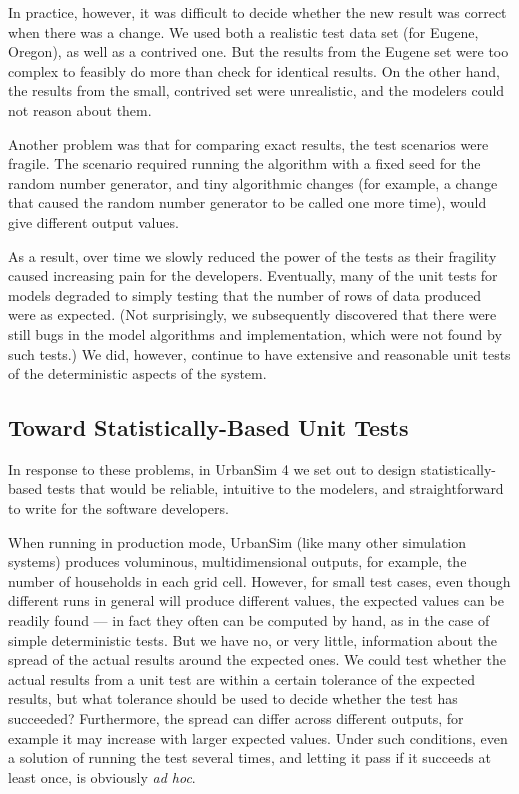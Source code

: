 \documentclass{sig-alternate-preprint}
\begin{document}
In practice, however, it was difficult to decide whether the new result was
correct when there was a change.  We used both a realistic test data set
(for Eugene, Oregon), as well as a contrived one.  But the results from the
Eugene set were too complex to feasibly do more than check for identical
results.  On the other hand, the results from the small, contrived set were
unrealistic, and the modelers could not reason about them.

Another problem was that for comparing exact results, the test scenarios were
fragile.  The scenario required running the algorithm with a fixed seed for the
random number generator, and tiny algorithmic changes (for example, a change
that caused the random number generator to be called one more time), would give
different output values.

As a result, over time we slowly reduced the power of the
tests as their fragility caused increasing pain for the developers.
Eventually, many of the unit tests for models
degraded to simply testing that the
number of rows of data produced were as expected.  (Not surprisingly, we
subsequently discovered that there were still bugs in the model algorithms
and implementation, which were not found by such tests.)  We did, however, continue to
have extensive and reasonable unit tests of the deterministic aspects of
the system.

\subsection{Toward Statistically-Based Unit Tests}

In response to these problems, in UrbanSim 4 we set out to
design statistically-based tests that would be reliable, intuitive to the
modelers, and straightforward to write for the software developers.

When running in production mode, UrbanSim (like many other simulation
systems) produces voluminous, multidimensional outputs, for example, the
number of households in each grid cell.  However, for small test cases,
even though different runs in general will produce different values, the
expected values can be readily found --- in fact they often can be computed
by hand, as in the case of simple deterministic tests.
But we have no, or very little, information about the spread of the
actual results around the expected ones.  We could test whether the actual
results from a unit test are within a certain tolerance of the expected
results, but what tolerance should be used to decide whether the test has
succeeded?  Furthermore, the spread can differ across different outputs,
for example it may increase with larger expected values. Under such
conditions, even a solution of running the test several times, and letting
it pass if it succeeds at least once, is obviously \emph{ad hoc}.
\end{document}
